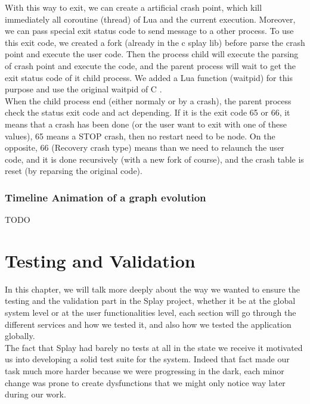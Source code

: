 \documentclass{eplmastersthesis}
\begin{document}
        With this way to exit, we can create a artificial crash point, which kill immediately all coroutine (thread)
        of Lua and the current execution. Moreover, we can pass special exit status code to send message to a other process.
        To use this exit code, we created a fork (already in the c splay lib) before parse the crash point and execute the user code.
        Then the process child will execute the parsing of crash point and execute the code, and the parent process will wait
        to get the exit status code of it child process. We added a Lua function (waitpid) for this purpose and use the
        original waitpid of C \cite{waitpid}. \\

        When the child process end (either normaly or by a crash), the parent process check the status exit code and act depending.
        If it is the exit code 65 or 66, it means that a crash has been done (or the user want to exit with one of these values),
        65 means a STOP crash, then no restart need to be node. On the opposite, 66 (Recovery crash type) means than we need to
        relaunch the user code,
        and it is done recursively (with a new fork of course), and the crash table is reset (by reparsing the original code).

      \subsection{Timeline Animation of a graph evolution}
      {\color{red} TODO}

  \chapter{Testing and Validation}

    In this chapter, we will talk more deeply about the way we wanted to ensure
    the testing and the validation part in the Splay project, whether it be
    at the global system level or at the user functionalities level, each
    section will go through the different services and how we tested it, and
    also how we tested the application globally.\\

    The fact that Splay had barely no tests at all in the state we receive it
    motivated us into developing a solid test suite for the system.
    Indeed that fact made our task much more harder because we were progressing
    in the dark, each minor change was prone to create dysfunctions that we
    might only notice way later during our work.\\
\end{document}
